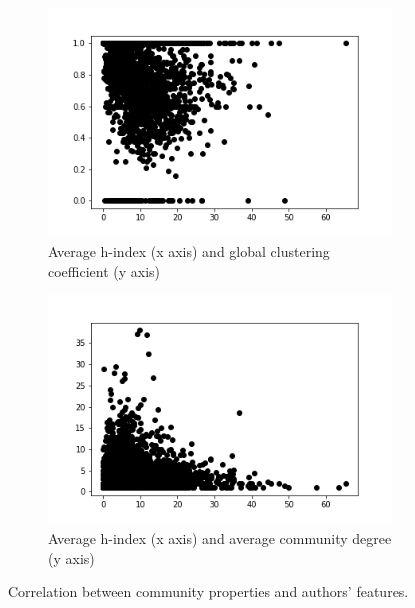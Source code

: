 \documentclass[sigchi]{acmart}
\begin{document}
\begin{figure}[]
\begin{subfigure}{.45\columnwidth}
  \centering
  \includegraphics[width=\columnwidth]{report/img/h_clustering.png} 
  \caption{Average h-index (x axis) and global clustering coefficient (y axis)}
  \label{fig:sub-clust}
\end{subfigure}
\hfill
\begin{subfigure}{.45\columnwidth}
  \centering
  \includegraphics[width=\columnwidth]{report/img/h_deg.png}
  \caption{Average h-index (x axis) and average community degree (y axis)}
  \label{fig:sub-deg}
\end{subfigure}
\hfill
\caption{Correlation between community properties and authors' features.}\label{fig:commCorrelation}
\end{figure}
\end{document}
